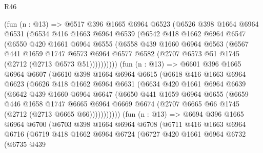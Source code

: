 \begin{lexlean}{R46}
\begin{coremodule}
        (fun (n : @13) =>
        @6517
          @396
          @1665
          @6964
          @6523
          (@6526
            @398
            @1664
            @6964
            @6531
            (@6534
              @416
              @1663
              @6964
              @6539
              (@6542
                @418
                @1662
                @6964
                @6547
                (@6550
                  @420
                  @1661
                  @6964
                  @6555
                  (@6558
                    @439
                    @1660
                    @6964
                    @6563
                    (@6567
                      @441
                      @1659
                      @1747
                      @6573
                      @6964
                      @6577
                      @6582
                      (@2707 @6573 @51 @1745 (@2712 (@2713 @6573 @51))))))))))
        (fun (n : @13) =>
        @6601
          @396
          @1665
          @6964
          @6607
          (@6610
            @398
            @1664
            @6964
            @6615
            (@6618
              @416
              @1663
              @6964
              @6623
              (@6626
                @418
                @1662
                @6964
                @6631
                (@6634
                  @420
                  @1661
                  @6964
                  @6639
                  (@6642
                    @439
                    @1660
                    @6964
                    @6647
                    (@6650
                      @441
                      @1659
                      @6964
                      @6655
                      (@6659
                        @446
                        @1658
                        @1747
                        @6665
                        @6964
                        @6669
                        @6674
                        (@2707 @6665 @66 @1745 (@2712 (@2713 @6665 @66)))))))))))
        (fun (n : @13) =>
        @6694
          @396
          @1665
          @6964
          @6700
          (@6703
            @398
            @1664
            @6964
            @6708
            (@6711
              @416
              @1663
              @6964
              @6716
              (@6719
                @418
                @1662
                @6964
                @6724
                (@6727
                  @420
                  @1661
                  @6964
                  @6732
                  (@6735
                    @439

\end{coremodule}
\end{lexlean}

